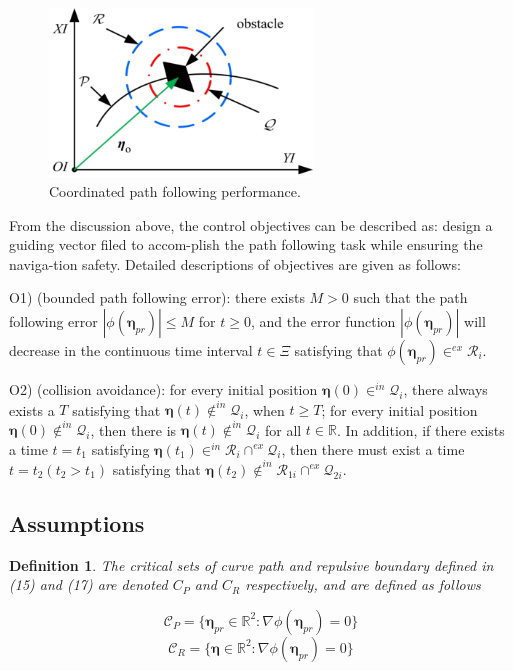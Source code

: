 \documentclass[a4paper, 10pt, conference]{ieeeconf}      %
\newtheorem{definition}{Definition}
\begin{document}
\begin{figure}[!htb]
	\centering
	\includegraphics[width=7cm]{fig2.eps}
	\caption{Coordinated path following performance.}
	\label{fig2}
\end{figure}

From the discussion above, the control objectives can be described as: design a guiding vector filed to accom-plish the path following task while ensuring the naviga-tion safety. Detailed descriptions of objectives are given as follows:

O1)	(bounded path following error): there exists $M>0$ such that the path following error $|\phi(\bm{\eta}_{pr})|\leq M$ for $t\geq 0$, and the error function $|\phi(\bm{\eta}_{pr})|$ will decrease in the continuous time interval $t\in \Xi$ satisfying that $\phi (\bm{\eta}_{pr})\in^{ex}\mathcal{R}_i$.

O2)	(collision avoidance): for every initial position $\bm{\eta} (0)\in^{in}\mathcal{Q}_i$, there always exists a $T$ satisfying that $\bm{\eta}(t)\notin^{in}\mathcal{Q}_{i}$, when $t\geq T$; for every initial position $\bm{\eta}(0)\notin^{in}\mathcal{Q}_i$, then there is $\bm{\eta} (t)\notin^{in}\mathcal{Q}_i$ for all $t\in \mathbb{R}$. In addition, if there exists a time $t=t_1$ satisfying $\bm{\eta} (t_1)\in^{in}\mathcal{R}_i\cap^{ex}\mathcal{Q}_i$, then there must exist a time $t=t_2 (t_2>t_1)$ satisfying that $\bm{\eta} (t_2)\notin^{in}\mathcal{R}_{1i}\cap^{ex}\mathcal{Q}_{2i}$.

\subsection{Assumptions}
\begin{definition}
	The critical sets of curve path and repulsive boundary defined in (15) and (17) are denoted $C_P$ and $C_R$ respectively, and are defined as follows
	
	\begin{equation}\label{eq9}
		\mathcal{C}_P=\{\bm{\eta}_{pr}\in\mathbb{R}^2:\nabla \phi(\bm{\eta}_{pr})=0\}
	\end{equation}
	\begin{equation}\label{eq10}
		\mathcal{C}_R=\{\bm{\eta}\in\mathbb{R}^2:\nabla 	\phi(\bm{\eta}_{pr})=0\} 
	\end{equation}
	
\end{definition}
\end{document}
